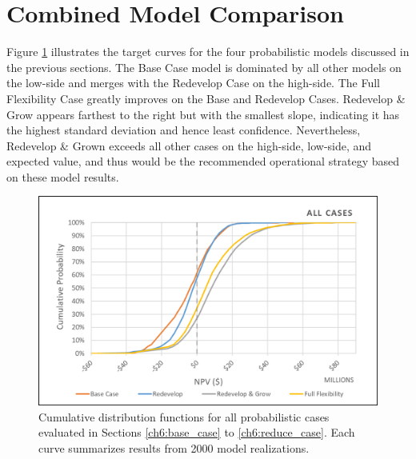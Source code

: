 \begin{table}[H]
\centering
{}
\caption[Full Flexibility Case statistics]{Full Flexibility case model statistics for 2000 model realizations. NPV$_s$ refers to the static model NPV reported in Section \ref{ch6:static_stats}.}
\label{tab:reduce_stats}
\end{table}

\section{Combined Model Comparison}

Figure \ref{fig:all_case_cdf} illustrates the target curves for the four probabilistic models discussed in the previous sections. The Base Case model is dominated by all other models on the low-side and merges with the Redevelop Case on the high-side. The Full Flexibility Case greatly improves on the Base and Redevelop Cases. Redevelop \& Grow appears farthest to the right but with the smallest slope, indicating it has the highest standard deviation and hence least confidence. Nevertheless, Redevelop \& Grown exceeds all other cases on the high-side, low-side, and expected value, and thus would be the recommended operational strategy based on these model results.

\begin{figure}%
\centering
\includegraphics[width=.8\textwidth]{templates/images/Figure-All_Case_CDF.png}
\caption[All Cases CDF]{Cumulative distribution functions for all probabilistic cases evaluated in Sections \ref{ch6:base_case} to \ref{ch6:reduce_case}. Each curve summarizes results from 2000 model realizations.}
\label{fig:all_case_cdf}
\end{figure}

